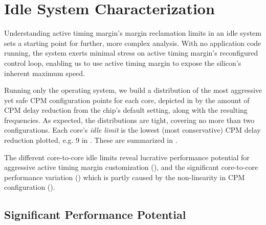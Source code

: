 \section{Idle System Characterization}
\label{sec:process:idle}

Understanding active timing margin's margin reclamation limits in an idle system sets a starting point for further, more complex analysis. With no application code running, the system exerts minimal stress on active timing margin's reconfigured control loop, enabling us to use active timing margin to expose the silicon's inherent maximum speed.


Running only the operating system, we build a distribution of the most aggressive yet safe CPM configuration points for each core, depicted in  by the amount of CPM delay reduction from the chip's default setting, along with the resulting frequencies. As expected, the distributions are tight, covering no more than two configurations. Each core's \textit{idle limit} is the lowest (most conservative) CPM delay reduction plotted, e.g. 9 in . These are summarized in . 



The different core-to-core idle limits reveal lucrative performance potential for aggressive active timing margin customization (), and the significant core-to-core performance variation () which is partly caused by the non-linearity in CPM configuration ().

\subsection{Significant Performance Potential}
\label{sec:process:idle:potential}

